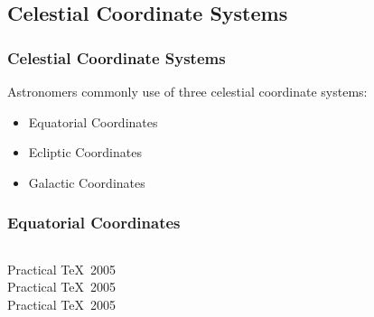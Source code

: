 \subsection{Celestial Coordinate Systems}
\begin{frame}
\frametitle{Celestial Coordinate Systems}
Astronomers commonly use of \alert{three} celestial coordinate systems:
\begin{itemize}
\item Equatorial Coordinates
\item Ecliptic Coordinates
\item Galactic Coordinates
\end{itemize}
\end{frame}
\begin{frame}
\frametitle{Equatorial Coordinates}

\begin{columns}[c]
Practical \TeX\ 2005\\
Practical \TeX\ 2005\\
Practical \TeX\ 2005

\end{columns}
\end{frame}

